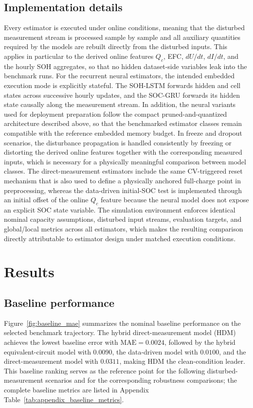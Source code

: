 \documentclass[review,nopreprintline]{elsarticle}
\begin{document}
\subsection{Implementation details}
Every estimator is executed under online conditions, meaning that the disturbed measurement stream is processed sample by sample and all auxiliary quantities required by the models are rebuilt directly from the disturbed inputs. This applies in particular to the derived online features $Q_c$, EFC, $dU/dt$, $dI/dt$, and the hourly SOH aggregates, so that no hidden dataset-side variables leak into the benchmark runs. For the recurrent neural estimators, the intended embedded execution mode is explicitly stateful. The SOH-LSTM forwards hidden and cell states across successive hourly updates, and the SOC-GRU forwards its hidden state causally along the measurement stream. In addition, the neural variants used for deployment preparation follow the compact pruned-and-quantized architecture described above, so that the benchmarked estimator classes remain compatible with the reference embedded memory budget. In freeze and dropout scenarios, the disturbance propagation is handled consistently by freezing or distorting the derived online features together with the corresponding measured inputs, which is necessary for a physically meaningful comparison between model classes. The direct-measurement estimators include the same CV-triggered reset mechanism that is also used to define a physically anchored full-charge point in preprocessing, whereas the data-driven initial-SOC test is implemented through an initial offset of the online $Q_c$ feature because the neural model does not expose an explicit SOC state variable. The simulation environment enforces identical nominal capacity assumptions, disturbed input streams, evaluation targets, and global/local metrics across all estimators, which makes the resulting comparison directly attributable to estimator design under matched execution conditions.

\section{Results}
\subsection{Baseline performance}
Figure~\ref{fig:baseline_mae} summarizes the nominal baseline performance on the selected benchmark trajectory. The hybrid direct-measurement model (HDM) achieves the lowest baseline error with $\mathrm{MAE}=0.0024$, followed by the hybrid equivalent-circuit model with $0.0090$, the data-driven model with $0.0100$, and the direct-measurement model with $0.0311$, making HDM the clean-condition leader. This baseline ranking serves as the reference point for the following disturbed-measurement scenarios and for the corresponding robustness comparisons; the complete baseline metrics are listed in Appendix Table~\ref{tab:appendix_baseline_metrics}.
\end{document}
